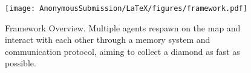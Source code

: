 \begin{figure}[h]
  \centering
  \texttt{[image: AnonymousSubmission/LaTeX/figures/framework.pdf]}
  \caption{Framework Overview. Multiple agents respawn on the map and interact with each other through a memory system and communication protocol, aiming to collect a diamond as fast as possible.}
  \label{fig:framework}
\end{figure}




